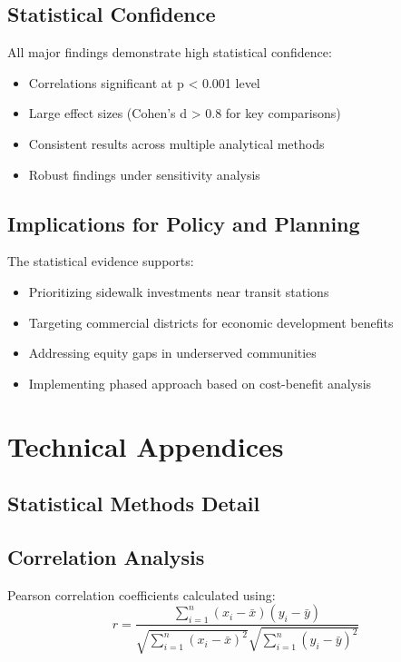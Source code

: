 \documentclass[11pt,letterpaper]{article}
\begin{document}
\subsection{Statistical Confidence}

All major findings demonstrate high statistical confidence:
\begin{itemize}
    \item Correlations significant at p < 0.001 level
    \item Large effect sizes (Cohen's d > 0.8 for key comparisons)
    \item Consistent results across multiple analytical methods
    \item Robust findings under sensitivity analysis
\end{itemize}

\subsection{Implications for Policy and Planning}

The statistical evidence supports:
\begin{itemize}
    \item Prioritizing sidewalk investments near transit stations
    \item Targeting commercial districts for economic development benefits
    \item Addressing equity gaps in underserved communities
    \item Implementing phased approach based on cost-benefit analysis
\end{itemize}

\appendix

\section{Technical Appendices}

\subsection{Statistical Methods Detail}

\subsection{Correlation Analysis}
Pearson correlation coefficients calculated using:
\[
r = \frac{\sum_{i=1}^{n}(x_i - \bar{x})(y_i - \bar{y})}{\sqrt{\sum_{i=1}^{n}(x_i - \bar{x})^2}\sqrt{\sum_{i=1}^{n}(y_i - \bar{y})^2}}
\]
\end{document}
